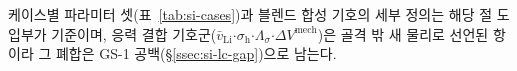 케이스별 파라미터 셋(표~\ref{tab:si-cases})과 블렌드 합성 기호의 세부 정의는 해당 절 도입부가 기준이며,
응력 결합 기호군($\bar v_\mathrm{Li}$$\cdot$$\sigma_\mathrm{h}$$\cdot$$\Lambda_\sigma$$\cdot$$\Delta V^\mathrm{mech}$)은
골격 밖 새 물리로 선언된 항이라 그 폐합은 GS-1 공백(\S\ref{ssec:si-lc-gap})으로 남는다.

